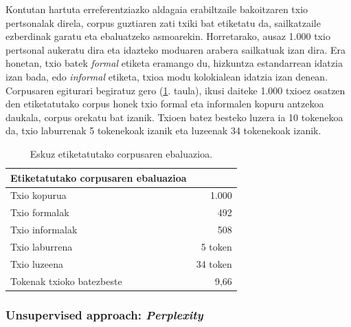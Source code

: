 \documentclass[information,article,submit,moreauthors,pdftex,10pt,a4paper]{Definitions/mdpi}
\begin{document}
\indent Kontutan hartuta erreferentziazko aldagaia erabiltzaile bakoitzaren txio pertsonalak direla, corpus guztiaren zati txiki bat etiketatu da, sailkatzaile ezberdinak garatu eta ebaluatzeko asmoarekin. Horretarako, ausaz 1.000 txio pertsonal aukeratu dira eta idazteko moduaren arabera sailkatuak izan dira. Era honetan, txio batek \textit{formal} etiketa eramango du, hizkuntza estandarrean idatzia izan bada, edo \textit{informal} etiketa, txioa modu kolokialean idatzia izan denean. Corpusaren egiturari begiratuz gero (\ref{tab:corpus-taula}. taula), ikusi daiteke 1.000 txioez osatzen den etiketatutako corpus honek txio formal eta informalen kopuru antzekoa daukala, corpus orekatu bat izanik. Txioen batez besteko luzera ia 10 tokenekoa da, txio laburrenak 5 tokenekoak izanik eta luzeenak 34 tokenekoak izanik.

\begin{table}[H]
  \centering
  \begin{tabular}{|l|r|}
    \hline
    \textbf{Etiketatutako corpusaren ebaluazioa} & \\ \hline 
    Txio kopurua & 1.000 \\ \hline
    Txio formalak & 492 \\ \hline
    Txio informalak & 508 \\ \hline
    Txio laburrena & 5 token \\ \hline
    Txio luzeena & 34 token \\ \hline
    Tokenak txioko batezbeste & 9,66 \\ \hline
  \end{tabular}
  \caption{Eskuz etiketatutako corpusaren ebaluazioa.}
  \label{tab:corpus-taula}
\end{table}

\subsubsection{Unsupervised approach: \textit{Perplexity}}\label{sec:estat}
\end{document}
